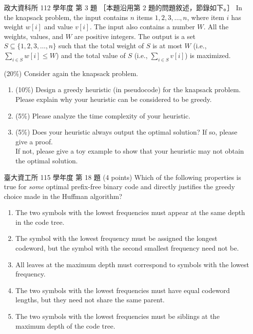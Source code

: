 \begin{pastexam}[label={px:gr-2}]{政大資科所 112 學年度 第 3 題}
［本題沿用第 2 題的問題敘述，節錄如下。］
In the knapsack problem, the input contains $n$ items $1,2,3,\dots,n$, where item $i$ has weight $w[i]$ and value $v[i]$. The input also contains a number $W$. All the weights, values, and $W$ are positive integers.
The output is a set $S\subseteq\{1,2,3,\dots,n\}$ such that the total weight of $S$ is at most $W$ (i.e., $\sum_{i\in S}w[i]\le W$) and the total value of $S$ (i.e., $\sum_{i\in S}v[i]$) is maximized.

\medskip
(20\%) Consider again the knapsack problem.
\begin{enumerate}[label=\arabic*),itemsep=2pt,topsep=2pt]
\item (10\%) Design a greedy heuristic (in pseudocode) for the knapsack problem.\\
Please explain why your heuristic can be considered to be greedy.
\item (5\%) Please analyze the time complexity of your heuristic.
\item (5\%) Does your heuristic always output the optimal solution? If so, please give a proof.\\
If not, please give a toy example to show that your heuristic may not obtain the optimal solution.
\end{enumerate}
\end{pastexam}

\begin{pastexam}[label={px:gr-3}]{臺大資工所 115 學年度 第 18 題}
(4 points) Which of the following properties is true for \emph{some} optimal prefix-free binary code and directly justifies the greedy choice made in the Huffman algorithm?
\begin{enumerate}[label=(\Alph*),leftmargin=2.2em,itemsep=1pt]
\item The two symbols with the lowest frequencies must appear at the same depth in the code tree.
\item The symbol with the lowest frequency must be assigned the longest codeword, but the symbol with the second smallest frequency need not be.
\item All leaves at the maximum depth must correspond to symbols with the lowest frequency.
\item The two symbols with the lowest frequencies must have equal codeword lengths, but they need not share the same parent.
\item The two symbols with the lowest frequencies must be siblings at the maximum depth of the code tree.
\end{enumerate}
\end{pastexam}

